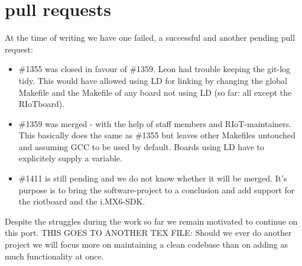 \section{pull requests}

At the time of writing we have one failed, a successful and another pending pull request:
\begin{itemize}
\item \#1355 was closed in favour of \#1359. Leon had trouble keeping the git-log tidy.
This would have allowed using LD for linking by changing the global Makefile and the
Makefile of any board not using LD (so far: all except the RIoTboard).
\item \#1359 was merged - with the help of staff members and RIoT-maintainers.
This basically does the same as \#1355 but leaves other Makefiles untouched and
assuming GCC to be used by default. Boards using LD have to explicitely supply a
variable.
\item \#1411 is still pending and we do not know whether it will be merged.
It's purpose is to bring the software-project to a conclusion and add support for
the riotboard and the i.MX6-SDK.
\end{itemize}

Despite the struggles during the work so far we remain motivated to continue on this
port.
THIS GOES TO ANOTHER TEX FILE:
Should we ever do another project we will focus more on maintaining a clean codebase than
on adding as much functionality at once.
